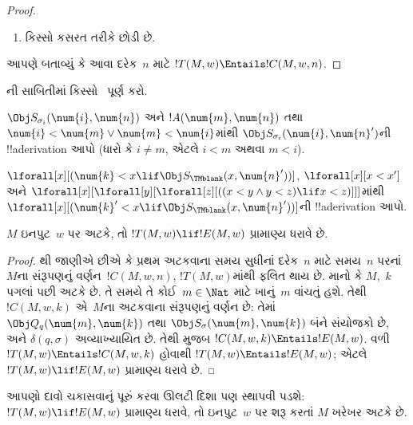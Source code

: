 \documentclass[../../../include/open-logic-section]{subfiles}
\begin{document}
\begin{proof}
\begin{enumerate}
\item {} કિસ્સો કસરત તરીકે છોડી છે.
\end{enumerate}
આપણે બતાવ્યું કે આવા દરેક~$n$ માટે
$!T(M, w) \Entails !C(M, w, n)$.
\end{proof}

\begin{prob}
ની સાબિતીમાં
કિસ્સો~ પૂર્ણ કરો.
\end{prob}

\begin{prob}
$\Obj S_{\sigma_i}(\num{i}, \num{n})$ અને
$!A(\num{m}, \num{n})$ તથા
$\num{i}<\num{m}\lor\num{m}<\num{i}$માંથી
$\Obj S_{\sigma_i}(\num{i}, \num{n}')$ની
!!a{derivation} આપો (ધારો કે $i \neq m$,
એટલે $i < m$ અથવા $m < i$).
\end{prob}

\begin{prob}
$\lforall[x][(\num{k} < x \lif \Obj
  S_\TMblank(x, \num{n}'))]$,
$\lforall[x][x < x']$ અને
$\lforall[x][\lforall[y][\lforall[z][ ((x < y \land y < z) \lif x <
      z)]]]$માંથી
$\lforall[x][(\num{k}' < x \lif \Obj
  S_\TMblank(x, \num{n}'))]$ની
!!a{derivation} આપો.
\end{prob}

\begin{lem}
$M$ ઇનપુટ~$w$ પર અટકે, તો
$!T(M, w) \lif !E(M, w)$ પ્રામાણ્ય ધરાવે છે.
\end{lem}

\begin{proof}
થી જાણીએ છીએ કે પ્રથમ
અટકવાના સમય સુધીનાં દરેક~$n$ માટે
સમય~$n$ પરનાં~$M$ના સંરૂપણનું
વર્ણન~$!C(M, w, n)$,
$!T(M, w)$માંથી ફલિત થાય છે.
માનો કે $M$,~$k$ પગલાં પછી અટકે છે. તે સમયે
તે કોઈ~$m \in \Nat$ માટે ખાનું~$m$ વાંચતું હશે.
તેથી $!C(M, w, k)$ એ~$M$ના અટકવાના
સંરૂપણનું વર્ણન છે: તેમાં
$\Obj Q_q(\num{m}, \num{k})$ તથા
$\Obj S_\sigma(\num{m}, \num{k})$ બંને સંયોજકો છે,
અને $\delta(q,\sigma)$ અવ્યાખ્યાયિત છે. તેથી
 મુજબ
$!C(M, w, k) \Entails !E(M, w)$. વળી
$!T(M, w) \Entails !C(M, w, k)$ હોવાથી
$!T(M, w) \Entails !E(M, w)$; એટલે
$!T(M, w) \lif !E(M, w)$ પ્રામાણ્ય ધરાવે છે.
\end{proof}

\begin{explain}
આપણો દાવો ચકાસવાનું પૂરું કરવા ઊલટી દિશા પણ
સ્થાપવી પડશે: $!T(M, w) \lif !E(M, w)$
પ્રામાણ્ય ધરાવે, તો ઇનપુટ~$w$ પર શરૂ કરતાં
$M$ ખરેખર અટકે છે.
\end{explain}
\end{document}
